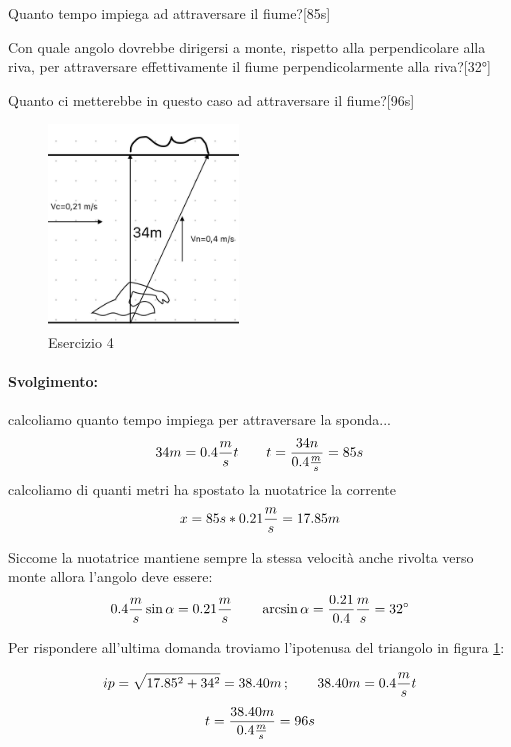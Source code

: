 Quanto tempo impiega ad attraversare il fiume?[85s]

Con quale angolo dovrebbe dirigersi a monte, rispetto alla perpendicolare alla riva, per attraversare effettivamente il fiume perpendicolarmente alla riva?[32°] 

Quanto ci metterebbe in questo caso ad attraversare il fiume?[96s]
\begin{figure}[tb]
\centering
\includegraphics[width=0.45\textwidth]{image/nuotatrice}
\caption{Esercizio 4}
\label{img:nuotatrice}
\end{figure}

\paragraph{Svolgimento:}
 

calcoliamo quanto tempo impiega per attraversare la sponda...
\begin{equation*}
    34m = 0.4\frac{m}{s} t\qquad{} t = \frac{34n}{0.4\frac{m}{s}} = 85s
\end{equation*}
calcoliamo di quanti metri ha spostato la nuotatrice la corrente
\begin{equation*}
    x = 85s*0.21\frac{m}{s} = 17.85m
\end{equation*}

Siccome la nuotatrice mantiene sempre la stessa velocità anche rivolta verso monte allora l'angolo deve essere: 
\begin{equation*}
    0.4\frac{m}{s} \sin{\alpha} = 0.21\frac{m}{s} \qquad{} \arcsin{\alpha} = \frac{0.21}{0.4}\frac{m}{s} = 32^\circ
\end{equation*}

Per rispondere all'ultima domanda troviamo l'ipotenusa del triangolo in figura \ref{img:nuotatrice}:

\begin{equation*}
    ip = \sqrt{17.85^2 + 34^2} = 38.40m\,;\qquad{} 38.40m = 0.4\frac{m}{s} t
\end{equation*}
\begin{equation*}
    t = \frac{38.40m}{0.4\frac{m}{s}} = 96s
\end{equation*}

